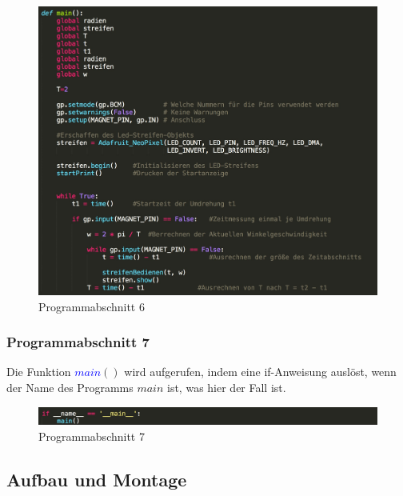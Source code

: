 \documentclass [a4paper, 11pt] {article}
\begin{document}
\begin{figure}[h]
	\centering
	\includegraphics[width=16cm]{P6.png}
	\caption{Programmabschnitt 6}
\end{figure} 
\subsubsection{Programmabschnitt 7}
Die Funktion \textcolor{blue}{$main$}{$()$} wird aufgerufen, indem eine if-Anweisung auslöst, wenn der Name des Programms {$main$} ist, was hier der Fall ist.
\begin{figure}[h]
	\centering
	\includegraphics[width=16cm]{P7.png}
	\caption{Programmabschnitt 7}
\end{figure}
\subsection{Aufbau und Montage}
\end{document}
